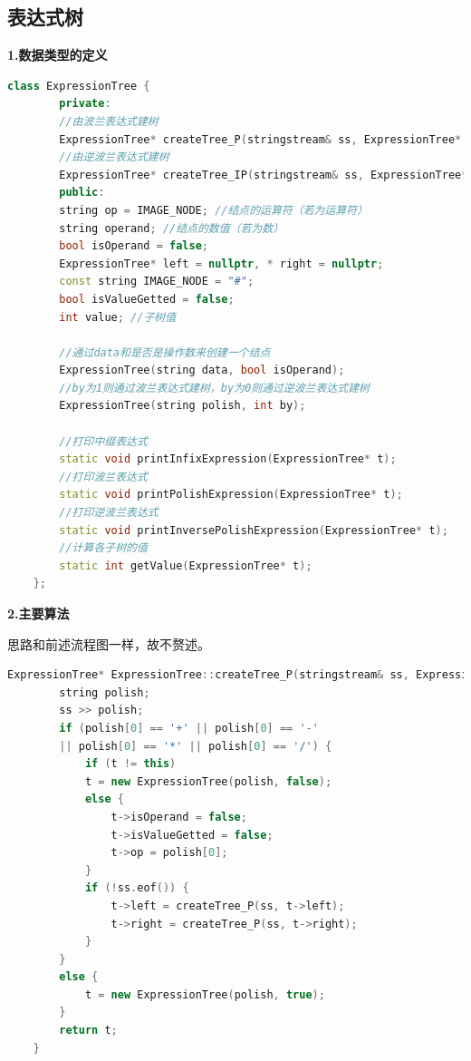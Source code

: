 \documentclass[UTF8]{article}
\newcommand{\jumpLine} {\hspace*{\fill} \\}
\begin{document}
	\subsection{表达式树}
	\textbf{1.数据类型的定义}\par
	\begin{lstlisting}[language=C++, name=表达式树数据类型定义]
	class ExpressionTree {
		private:
		//由波兰表达式建树
		ExpressionTree* createTree_P(stringstream& ss, ExpressionTree* t);
		//由逆波兰表达式建树
		ExpressionTree* createTree_IP(stringstream& ss, ExpressionTree* t);
		public:
		string op = IMAGE_NODE; //结点的运算符（若为运算符）
		string operand; //结点的数值（若为数）
		bool isOperand = false;
		ExpressionTree* left = nullptr, * right = nullptr;
		const string IMAGE_NODE = "#";
		bool isValueGetted = false;
		int value; //子树值
		
		//通过data和是否是操作数来创建一个结点
		ExpressionTree(string data, bool isOperand);
		//by为1则通过波兰表达式建树，by为0则通过逆波兰表达式建树
		ExpressionTree(string polish, int by);
		
		//打印中缀表达式
		static void printInfixExpression(ExpressionTree* t);
		//打印波兰表达式
		static void printPolishExpression(ExpressionTree* t);
		//打印逆波兰表达式
		static void printInversePolishExpression(ExpressionTree* t);
		//计算各子树的值
		static int getValue(ExpressionTree* t);
	};
	\end{lstlisting}\par
	\textbf{2.主要算法}\par
	思路和前述流程图一样，故不赘述。
	\begin{lstlisting}[language=C++, name=通过波兰表达式建树]
	ExpressionTree* ExpressionTree::createTree_P(stringstream& ss, ExpressionTree* t) {
		string polish;
		ss >> polish;
		if (polish[0] == '+' || polish[0] == '-'
		|| polish[0] == '*' || polish[0] == '/') {
			if (t != this)
			t = new ExpressionTree(polish, false);
			else {
				t->isOperand = false;
				t->isValueGetted = false;
				t->op = polish[0];
			}
			if (!ss.eof()) {
				t->left = createTree_P(ss, t->left);
				t->right = createTree_P(ss, t->right);
			}
		}
		else {
			t = new ExpressionTree(polish, true);
		}
		return t;
	}
	\end{lstlisting}\par
	\jumpLine
\end{document}
